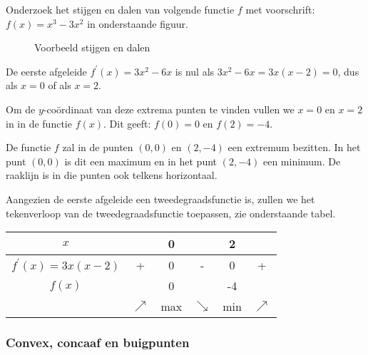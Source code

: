 \begin{voorbeeld}
	Onderzoek het stijgen en dalen van volgende functie $f$ met voorschrift: $f(x)=x^{3}-3x^{2}$ in onderstaande figuur.

\begin{figure}[h]
	\centering          
	
	\caption{Voorbeeld stijgen en dalen}
	\label{fig:verloop_stijgen_en_dalen}	
\end{figure}
De eerste afgeleide $f^{'}(x)=3x^{2}-6x$ is nul als $3x^{2}-6x=3x(x-2)=0$, dus als $x=0$ of als $x=2$.

Om de $y$-co\"ordinaat van deze extrema punten te vinden
vullen we $x=0$ en $x=2$ in in de functie $f(x)$. Dit geeft: $f(0)=0$
en $f(2)=-4$.

De functie $f$ zal in de punten $(0,0)$ en $(2,-4)$ een
extremum bezitten. In het punt $(0,0)$ is dit een maximum en in het
punt $(2,-4)$ een minimum. De raaklijn is in die punten ook telkens
horizontaal.

Aangezien de eerste afgeleide een tweedegraadsfunctie is,
zullen we het tekenverloop van de tweedegraadsfunctie toepassen, zie onderstaande tabel.

\begin{center}
	\begin{tabular}{c||c|c|c|c|c}
	$x$ &  & 0 &  & 2 & \tabularnewline
	\hline 
	$f^{'}(x)=3x(x-2)$ & + & 0 & - & 0 & + \\
	\hline 
	$f(x)$ &  & 0 &  & -4 & \\
	& $\nearrow$ & max & $\searrow$ & min & $\nearrow$ \\
\end{tabular}
\end{center}



\end{voorbeeld}

\subsubsection{Convex, concaaf en buigpunten}

